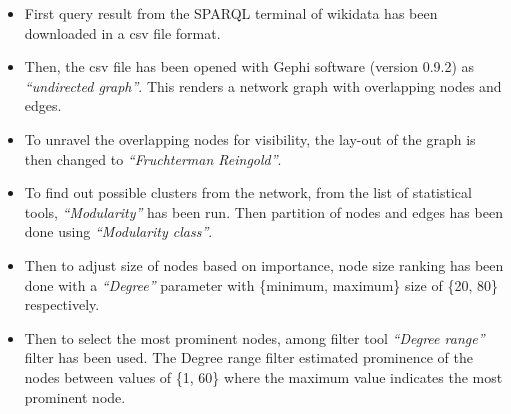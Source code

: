 \begin{itemize}
	\item First query result from the SPARQL terminal of wikidata has been downloaded in a csv file format. 
	\item Then, the csv file has been opened with Gephi software (version 0.9.2) as \emph{“undirected graph”}. This renders a network graph with overlapping nodes and edges. 
	\item To unravel the overlapping nodes for visibility, the lay-out of the graph is then changed to \emph{“Fruchterman Reingold”}. 
	\item To find out possible clusters from the network, from the list of statistical tools, \emph{“Modularity”} has been run. Then partition of nodes and edges has been done using \emph{“Modularity class”}. 
	\item Then to adjust size of nodes based on importance, node size ranking has been done with a \emph{“Degree”} parameter with \{minimum, maximum\} size of  \{20, 80\} respectively. 
	\item Then to select the most prominent nodes, among filter tool \emph{“Degree range”} filter has been used. The Degree range filter estimated prominence of the nodes between values of \{1, 60\} where the maximum value indicates the most prominent node. 
\end{itemize}


